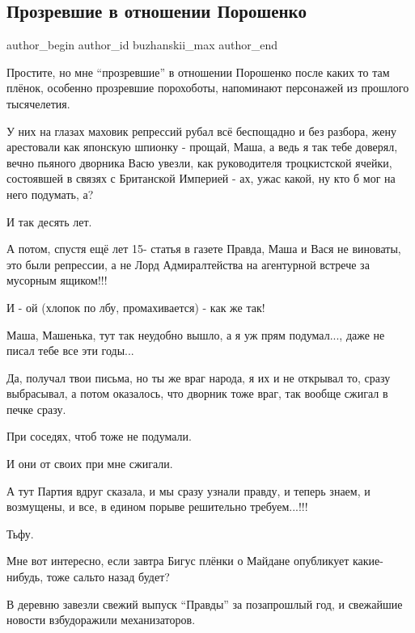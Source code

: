  
 
 
 
 
 
\subsection{Прозревшие в отношении Порошенко}
\label{sec:08_06_2021.fb.buzhanskii_max.1.poroshenko_plenki_slepota}
\ifcmt
 author_begin
   author_id buzhanskii_max
 author_end
\fi

Простите, но мне \enquote{прозревшие} в отношении Порошенко после каких то там плёнок,
особенно прозревшие порохоботы, напоминают персонажей из прошлого тысячелетия.

У них на глазах маховик репрессий рубал всё беспощадно и без разбора, жену
арестовали как японскую шпионку - прощай, Маша, а ведь я так тебе доверял,
вечно пьяного дворника Васю увезли, как руководителя троцкистской ячейки,
состоявшей в связях с Британской Империей - ах, ужас какой, ну кто б мог на
него подумать, а?

И так десять лет.

А потом, спустя ещё лет 15- статья в газете Правда, Маша и Вася не виноваты,
это были репрессии, а не Лорд Адмиралтейства на агентурной встрече за мусорным
ящиком!!!

И - ой (хлопок по лбу, промахивается) - как же так!

Маша, Машенька, тут так неудобно вышло, а я уж прям подумал..., даже не писал
тебе все эти годы...

Да, получал твои письма, но ты же враг народа, я их и не открывал то, сразу
выбрасывал, а потом оказалось, что дворник тоже враг, так вообще сжигал в печке
сразу.

При соседях,  чтоб тоже не подумали.

И они от своих при мне сжигали.

А тут Партия вдруг сказала, и мы сразу узнали правду, и теперь знаем, и
возмущены, и все, в едином порыве решительно требуем...!!!

Тьфу.

Мне вот интересно, если завтра Бигус плёнки о Майдане опубликует какие-нибудь,
тоже сальто назад будет?

В деревню завезли свежий выпуск \enquote{Правды} за позапрошлый год, и
свежайшие новости взбудоражили механизаторов.
